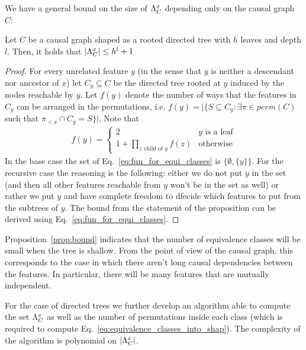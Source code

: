 We have a general bound on the size of $\Lambda_C^x$ depending only on the causal graph $C$:

\begin{proposition}\label{prop:bound}
	Let $C$ be a causal graph shaped as a rooted directed tree with $h$ leaves and depth $l$. Then, it holds that $|\Lambda_C^x|\leq h^l + 1$	
\end{proposition}

\begin{proof}
	For every unrelated feature $y$ (in the sense that $y$ is neither a descendant nor ancestor of $x$) let $C_y \subseteq C$ be the directed tree rooted at $y$ induced by the nodes reachable by $y$. Let $f(y)$ denote the number of ways that the features in $C_y$ can be arranged in the permutations, i.e. $f(y) = \big| \{S \subseteq C_y : \exists \pi \in perm(C)$ such that $ \pi_{<x} \cap C_y = S\} \big|$. Note that
	\begin{align}\label{eq:fun_for_equi_classes}
		f(y) = \begin{cases}
			2 & y \text{ is a leaf}\\
			1 + \prod_{z \text{ child of } y} f(z) & \text{otherwise}
		\end{cases}
	\end{align}
	In the base case the set of Eq.~\eqref{eq:fun_for_equi_classes} is $\{\emptyset, \{y\}\}$. For the recursive case the reasoning is the following: either we do not put $y$ in the set (and then all other features reachable from $y$ won't be in the set as well) or rather 
	we put $y$ and have complete freedom to dfecide which features to put from the subtrees of $y$. The bound from the statement of the proposition can be derived using Eq.~\eqref{eq:fun_for_equi_classes}.
\end{proof}

Proposition~\ref{prop:bound} indicates that the number of equivalence classes will be small when the tree is shallow. From the point of view of the causal graph, this corresponds to the case in which there aren't long causal dependencies between the features. In particular, there will be many features that are mutually independent.

For the case of directed trees we further develop an algorithm able to compute the set $\Lambda_C^x$ as well as the number of permutations inside each class (which is required to compute Eq.~\eqref{eq:equivalence_classes_into_shap}). The complexity of the algorithm
is polynomial on $|\Lambda_C^x|$.

